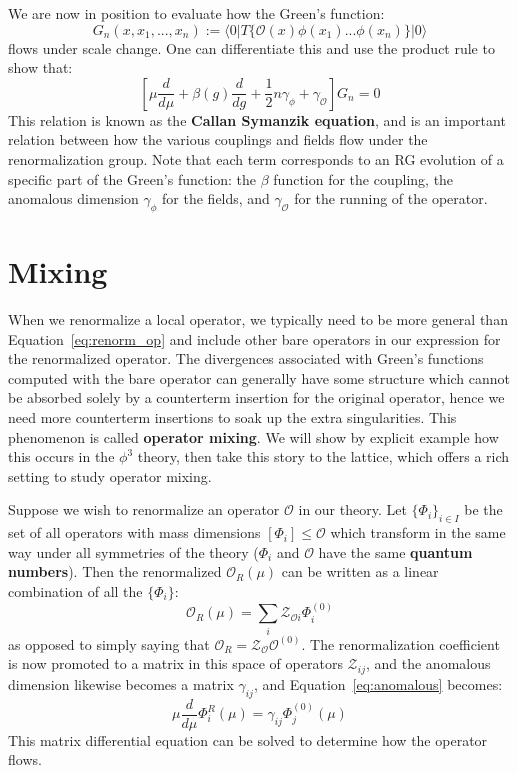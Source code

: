 \documentclass[11pt, oneside]{article}   	%
\theoremstyle{definition}
\begin{document}
We are now in position to evaluate how the Green's function:
\begin{equation}
	G_n(x, x_1, ..., x_n) := \langle 0 | T\{\mathcal O(x) \phi(x_1) ... \phi(x_n)\} | 0\rangle
\end{equation}
flows under scale change. One can differentiate this and use the product rule to show that:
\begin{equation}
	\left[ \mu \frac{d}{d\mu} + \beta(g) \frac{d}{dg} + \frac{1}{2} n\gamma_\phi + \gamma_\mathcal{O} \right] G_n = 0
\end{equation}
This relation is known as the \textbf{Callan Symanzik equation}, and is an important relation between how the various 
couplings and fields flow under the renormalization group. Note that each term corresponds to an RG evolution of a 
specific part of the Green's function: the $\beta$ function for the coupling, the anomalous dimension $\gamma_\phi$ 
for the fields, and $\gamma_\mathcal{O}$ for the running of the operator. 

\section{Mixing}

When we renormalize a local operator, we typically need to be more general than Equation~\ref{eq:renorm_op} and 
include other bare operators in our expression for the renormalized operator. The divergences associated with 
Green's functions computed with the bare operator can generally have some structure which cannot be absorbed 
solely by a counterterm insertion for the original operator, hence we need more counterterm insertions to soak 
up the extra singularities. This phenomenon is called \textbf{operator mixing}. We will show by explicit example how this 
occurs in the $\phi^3$ theory, then take this story to the lattice, which offers a rich setting to study operator mixing. 

Suppose we wish to renormalize an operator $\mathcal O$ in our theory. Let $\{\Phi_i\}_{i\in I}$ be the set of all 
operators with mass dimensions $[\Phi_i] \leq \mathcal O$ which transform in the same way under all symmetries 
of the theory ($\Phi_i$ and $\mathcal O$ have the same \textbf{quantum numbers}). Then the renormalized 
$\mathcal O_R(\mu)$ can be written as a linear combination of all the $\{\Phi_i\}$:
\begin{equation}
	\mathcal O_R(\mu) = \sum_i \mathcal Z_{\mathcal{O}i} \Phi_i^{(0)}
\end{equation}
as opposed to simply saying that $\mathcal O_R = \mathcal Z_\mathcal{O} \mathcal O^{(0)}$. The renormalization 
coefficient is now promoted to a matrix in this space of operators $\mathcal Z_{ij}$, and the anomalous dimension 
likewise becomes a matrix $\gamma_{ij}$, and Equation~\ref{eq:anomalous} becomes:
\begin{equation}
	\mu\frac{d}{d\mu} \Phi_i^R(\mu) = \gamma_{ij} \Phi_j^{(0)}(\mu)
\end{equation}
This matrix differential equation can be solved to determine how the operator flows.
\end{document}
